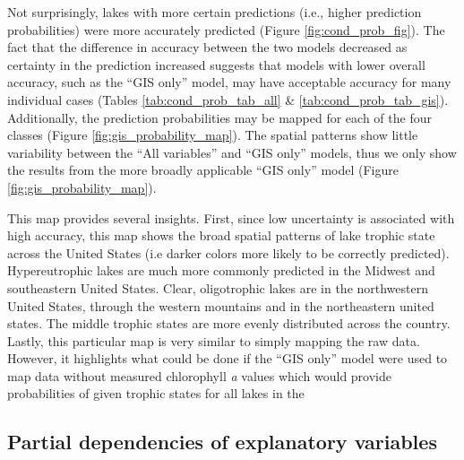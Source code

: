 \documentclass[12pt,]{article}
\begin{document}
Not surprisingly, lakes with more certain predictions (i.e., higher
prediction probabilities) were more accurately predicted (Figure
\ref{fig:cond_prob_fig}). The fact that the difference in accuracy
between the two models decreased as certainty in the prediction
increased suggests that models with lower overall accuracy, such as the
``GIS only'' model, may have acceptable accuracy for many individual
cases (Tables \ref{tab:cond_prob_tab_all} \&
\ref{tab:cond_prob_tab_gis}). Additionally, the prediction probabilities
may be mapped for each of the four classes (Figure
\ref{fig:gis_probability_map}). The spatial patterns show little
variability between the ``All variables'' and ``GIS only'' models, thus
we only show the results from the more broadly applicable ``GIS only''
model (Figure \ref{fig:gis_probability_map}).

This map provides several insights. First, since low uncertainty is
associated with high accuracy, this map shows the broad spatial patterns
of lake trophic state across the United States (i.e darker colors more
likely to be correctly predicted). Hypereutrophic lakes are much more
commonly predicted in the Midwest and southeastern United States. Clear,
oligotrophic lakes are in the northwestern United States, through the
western mountains and in the northeastern united states. The middle
trophic states are more evenly distributed across the country. Lastly,
this particular map is very similar to simply mapping the raw data.
However, it highlights what could be done if the ``GIS only'' model were
used to map data without measured chlorophyll \emph{a} values which
would provide probabilities of given trophic states for all lakes in the

\subsection{Partial dependencies of explanatory
variables}\label{partial-dependencies-of-explanatory-variables}
\end{document}

